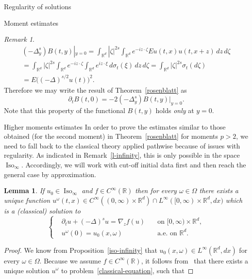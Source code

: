 \documentclass[a4paper,10pt,fleqn]{amsart}
\newtheorem{lemma}[theorem]{Lemma}
\theoremstyle{remark}
\newtheorem{remark}[theorem]{Remark}
\theoremstyle{definition}
\DeclareMathOperator{\Iso}{Iso}
\newcommand{\dt} {\partial_t}
\newcommand{\grad} {\nabla_{\!z}}
\newcommand{\X} {{\mathbb{R}^d}}
\newcommand{\R} {\mathbb{R}}
\newcommand{\T} {[0,\infty)}
\renewcommand{\=} {\overset{d}{=}}
\newcommand{\fLap} {(-\Delta)^s}
\begin{document}
\begin{section}{Regularity of solutions}
\begin{subsection}{Moment estimates}
\begin{remark}
     \begin{multline*}
      (-\Delta^s_y) B(t,y)|_{y=0} 
      = \int_\X |\zeta|^{2s}\int_\X e^{-iz\cdot\zeta}Eu(t,x)u(t,x+z)\,dz\,d\zeta\\
      = \int_\X |\zeta|^{2s}\int_\X e^{-iz\cdot\zeta}\int_\X e^{iz\cdot \xi}\,d\sigma_t(\xi)\,dz\,d\zeta
      = \int_\X |\zeta|^{2s}\sigma_t(d\zeta)\\
      = E\big((-\Delta)^{s/2}u(t)\big)^2. 
     \end{multline*}
     Therefore we may write the result of Theorem~\ref{rosenblatt} as 
     \begin{equation*}
      \dt B(t,0) = -2(-\Delta^s_y) B(t,y)|_{y=0}.
     \end{equation*}
     Note that this property of the functional $B(t,y)$ holds \emph{only} at $y=0$.
    \end{remark}
  \end{subsection}
  \begin{subsection}{Higher moments estimates}
  In order to prove the estimates similar to those obtained (for the second moment) in Theorem~\ref{rosenblatt} for moments $p>2$, we need to
  fall back to the classical theory applied pathwise because of issues with regularity. As indicated in Remark~\ref{l-infinity}, this is
  only possible in the space $\Iso_\infty$. Accordingly, we will work with cut-off initial data
  first and then reach the general case by approximation.  
    \begin{lemma}\label{classical-solutions}
     If $u_0\in\Iso_\infty$ and $f\in C^\infty(\R)$ then
     for every $\omega\in\Omega$  there exists a unique function 
     $u^\omega(t,x)\in C^\infty((0,\infty)\times\X)\cap L^\infty(\T\times\X,dx)$ which is a (classical) solution to
     \begin{equation}\label{classical-equation}
     \left\{
      \begin{aligned}
        &\dt u + \fLap u = \grad f(u)\quad&\text{on $\T\times\X$}, \\
        &u^\omega(0) = u_0(x,\omega)\quad&\text{a.e. on $\X$}.
      \end{aligned}
      \right.
      \end{equation}
    \end{lemma}
    \begin{proof}
     We know from Proposition~\ref{iso-infinity} that $u_0(x,\omega)\in L^\infty(\X,dx)$ for every 
     $\omega\in\Omega$. Because we assume $f\in C^\infty(\R)$, it follows from~\cite[Theorem 1.1]{MR2019032} that there exists a unique solution $u^\omega$ to problem~\eqref{classical-equation}, such that

\end{proof}
\end{subsection}
\end{section}
\end{document}
